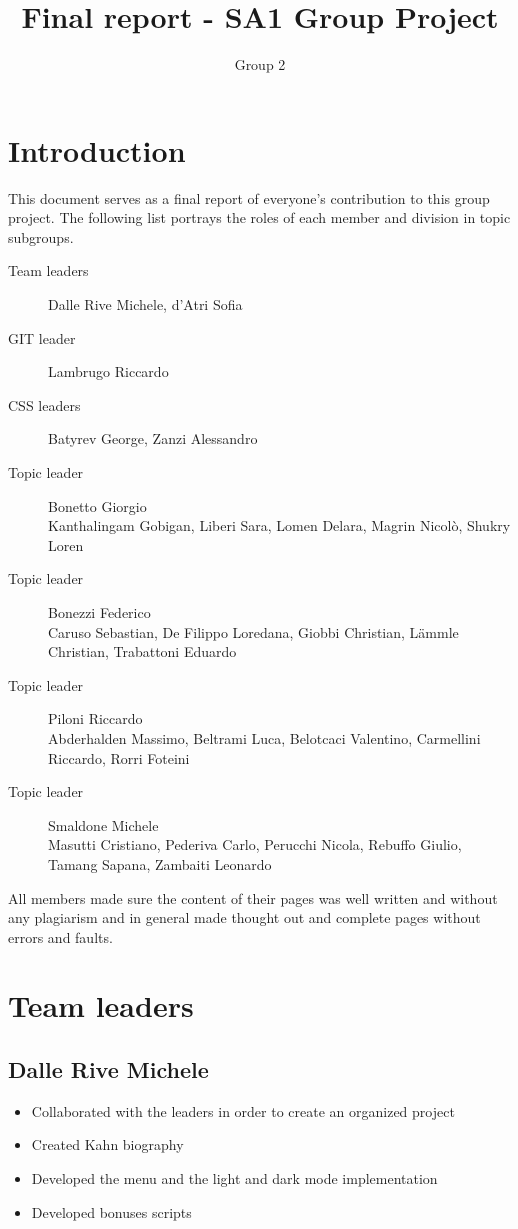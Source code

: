 \documentclass[11pt]{article}
\title{Final report - SA1 Group Project}
\author{Group 2}
\date{}
\begin{document}
\maketitle

\section*{Introduction}
This document serves as a final report of everyone's contribution to this group project. The following list portrays the roles of each member and division in topic subgroups.

\begin{description}
 \item[Team leaders]Dalle Rive Michele, d'Atri Sofia
 \item[GIT leader]Lambrugo Riccardo
 \item[CSS leaders]Batyrev George, Zanzi Alessandro
\item[Topic leader]Bonetto Giorgio\\Kanthalingam Gobigan, Liberi Sara, Lomen Delara, Magrin Nicolò, Shukry Loren
 \item[Topic leader]Bonezzi Federico\\Caruso Sebastian, De Filippo Loredana, Giobbi Christian, Lämmle Christian, Trabattoni Eduardo
 \item[Topic leader]Piloni Riccardo\\Abderhalden Massimo, Beltrami Luca, Belotcaci Valentino, Carmellini Riccardo, Rorri Foteini
 \item[Topic leader]Smaldone Michele\\Masutti Cristiano, Pederiva Carlo, Perucchi Nicola, Rebuffo Giulio, Tamang Sapana, Zambaiti Leonardo
\end{description}

 All members made sure the content of their pages was well written and without any plagiarism and in general made thought out and complete pages without errors and faults.

\section*{Team leaders}
\subsection*{Dalle Rive Michele}
\begin{itemize}
\item Collaborated with the leaders in order to create an organized project
\item Created Kahn biography
\item Developed the menu and the light and dark mode implementation
\item Developed bonuses scripts
\end{itemize}
\end{document}
